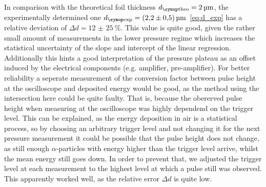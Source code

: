 In comparison with the theoretical foil thickness $d_\T{theo} = \qty{2}{\micro\meter}$, the experimentally determined one $d_\T{exp} = \qty{2.2(0.5)}{\micro\meter}$~\eqref{eq:d_exp} has a relative deviation of $\Delta d = \qty{12(25)}{\%}$.
This value is quite good, given the rather small amount of measurements in the lower pressure regime which increases the statistical uncertainty of the slope and intercept of the linear regression. 
Additionally this hints a good interpretation of the pressure plateau as an offset induced by the electrical components (e.g. amplifier, pre-amplifier). 
For better reliability a seperate measurement of the conversion factor between pulse height at the oscilloscope and deposited energy would be good, as the method using the intersection here could be quite faulty. 
That is, because the obererved pulse height when measuring at the oscilloscope was highly dependend on the trigger level. 
This can be explained, as the energy deposition in air is a statistical process, so by choosing an arbitrary trigger level and not changing it for the next pressure measurement it could be possible that the pulse height does not change, as still enough $\alpha$-particles with energy higher than the trigger level arrive, whilst the mean energy still goes down.
In order to prevent that, we adjusted the trigger level at each measurement to the highest level at which a pulse still was observed. 
This apparently worked well, as the relative error $\Delta d$ is quite low.



\clearpage